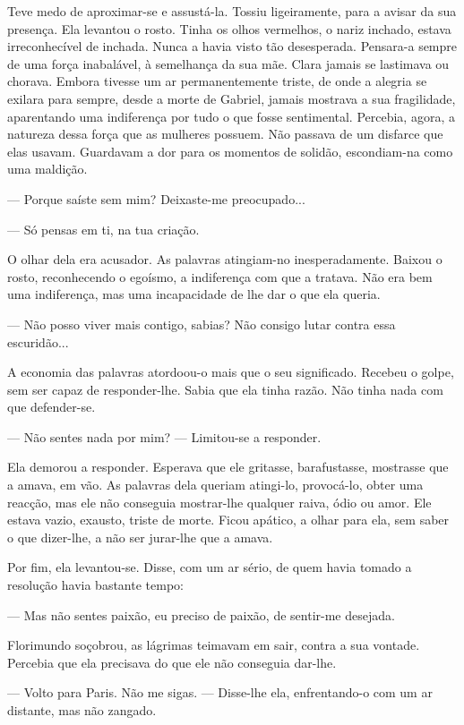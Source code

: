 Teve medo de aproximar-se e assustá-la. Tossiu ligeiramente, para a
avisar da sua presença. Ela levantou o rosto. Tinha os olhos vermelhos,
o nariz inchado, estava irreconhecível de inchada. Nunca a havia visto
tão desesperada. Pensara-a sempre de uma força inabalável, à semelhança
da sua mãe. Clara jamais se lastimava ou chorava. Embora tivesse um ar
permanentemente triste, de onde a alegria se exilara para sempre, desde
a morte de Gabriel, jamais mostrava a sua fragilidade, aparentando uma
indiferença por tudo o que fosse sentimental. Percebia, agora, a
natureza dessa força que as mulheres possuem. Não passava de um disfarce
que elas usavam. Guardavam a dor para os momentos de solidão,
escondiam-na como uma maldição.

--- Porque saíste sem mim? Deixaste-me preocupado...

--- Só pensas em ti, na tua criação.

O olhar dela era acusador. As palavras atingiam-no inesperadamente.
Baixou o rosto, reconhecendo o egoísmo, a indiferença com que a tratava.
Não era bem uma indiferença, mas uma incapacidade de lhe dar o que ela
queria.

--- Não posso viver mais contigo, sabias? Não consigo lutar contra essa
escuridão...

A economia das palavras atordoou-o mais que o seu significado. Recebeu o
golpe, sem ser capaz de responder-lhe. Sabia que ela tinha razão. Não
tinha nada com que defender-se.

--- Não sentes nada por mim? ---  Limitou-se a responder.

Ela demorou a responder. Esperava que ele gritasse, barafustasse,
mostrasse que a amava, em vão. As palavras dela queriam atingi-lo,
provocá-lo, obter uma reacção, mas ele não conseguia mostrar-lhe
qualquer raiva, ódio ou amor. Ele estava vazio, exausto, triste de
morte. Ficou apático, a olhar para ela, sem saber o que dizer-lhe, a não
ser jurar-lhe que a amava.

Por fim, ela levantou-se. Disse, com um ar sério, de quem havia tomado a
resolução havia bastante tempo:

--- Mas não sentes paixão, eu preciso de paixão, de sentir-me desejada.

Florimundo soçobrou, as lágrimas teimavam em sair, contra a sua vontade.
Percebia que ela precisava do que ele não conseguia dar-lhe.

--- Volto para Paris. Não me sigas. ---  Disse-lhe ela, enfrentando-o com um
ar distante, mas não zangado.

